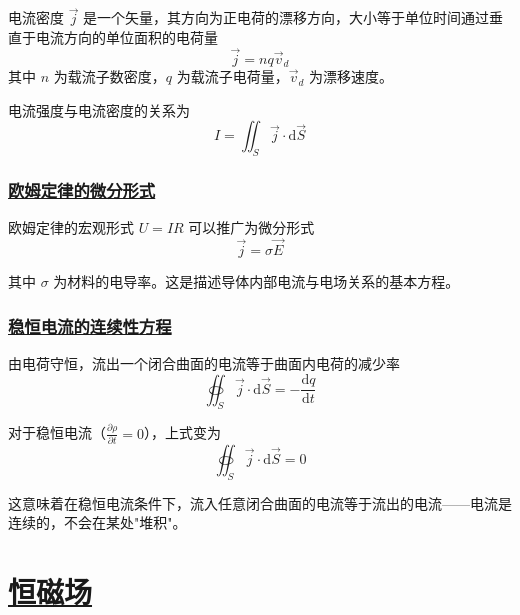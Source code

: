 \begin{definition}[电流密度]
    电流密度 $\vec{j}$ 是一个矢量，其方向为正电荷的漂移方向，大小等于单位时间通过垂直于电流方向的单位面积的电荷量
    \begin{equation}
        \vec{j} = nq\vec{v}_d
    \end{equation}
    其中 $n$ 为载流子数密度，$q$ 为载流子电荷量，$\vec{v}_d$ 为漂移速度。
\end{definition}

电流强度与电流密度的关系为
\begin{equation}
    I = \iint_S \vec{j} \cdot \mathrm{d}\vec{S}
\end{equation}

\subsubsection{\protect\hyperlink{:}{欧姆定律的微分形式}}

欧姆定律的宏观形式 $U = IR$ 可以推广为微分形式
\begin{equation}
    \vec{j} = \sigma\vec{E}
\end{equation}

其中 $\sigma$ 为材料的电导率。这是描述导体内部电流与电场关系的基本方程。

\subsubsection{\protect\hyperlink{:}{稳恒电流的连续性方程}}

由电荷守恒，流出一个闭合曲面的电流等于曲面内电荷的减少率
\begin{equation}
    \oiint_S \vec{j} \cdot \mathrm{d}\vec{S} = -\frac{\mathrm{d}q}{\mathrm{d}t}
\end{equation}

对于稳恒电流（$\frac{\partial \rho}{\partial t} = 0$），上式变为
\begin{equation}
    \oiint_S \vec{j} \cdot \mathrm{d}\vec{S} = 0
\end{equation}

这意味着在稳恒电流条件下，流入任意闭合曲面的电流等于流出的电流——电流是连续的，不会在某处"堆积"。


\newpage
\section{\protect\hyperlink{:}{恒磁场}}

